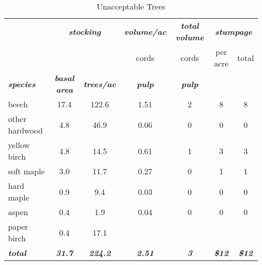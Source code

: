 \documentclass[landscape]{article}
\begin{document}
\begin{table}[H]

\caption{\label{tab:unnamed-chunk-43}Unacceptable Trees}
\fontsize{10}{12}\selectfont
\begin{tabular}[t]{lcccccc}
\toprule
\multicolumn{1}{c}{\em{\textbf{ }}} & \multicolumn{2}{c}{\em{\textbf{stocking}}} & \multicolumn{1}{c}{\em{\textbf{volume/ac }}} & \multicolumn{1}{c}{\em{\textbf{total volume}}} & \multicolumn{2}{c}{\em{\textbf{stumpage}}} \\
\cmidrule(l{3pt}r{3pt}){2-3} \cmidrule(l{3pt}r{3pt}){4-4} \cmidrule(l{3pt}r{3pt}){5-5} \cmidrule(l{3pt}r{3pt}){6-7}
\multicolumn{3}{c}{ } & \multicolumn{1}{c}{cords} & \multicolumn{1}{c}{cords} & \multicolumn{1}{c}{per acre} & \multicolumn{1}{c}{total} \\
\cmidrule(l{3pt}r{3pt}){4-4} \cmidrule(l{3pt}r{3pt}){5-5} \cmidrule(l{3pt}r{3pt}){6-6} \cmidrule(l{3pt}r{3pt}){7-7}
\rowcolor[HTML]{DCDCDC}  \em{\textbf{species}} & \em{\textbf{basal area}} & \em{\textbf{trees/ac}} & \em{\textbf{pulp}} & \em{\textbf{pulp}} & \em{\textbf{ }} & \em{\textbf{ }}\\
\midrule
\rowcolor{gray!6}  beech & 17.4 & 122.6 & 1.51 & 2 & 8 & 8\\
 
other hardwood & 4.8 & 46.9 & 0.06 & 0 & 0 & 0\\
 
\rowcolor{gray!6}  yellow birch & 4.8 & 14.5 & 0.61 & 1 & 3 & 3\\
 
soft maple & 3.0 & 11.7 & 0.27 & 0 & 1 & 1\\
 
\rowcolor{gray!6}  hard maple & 0.9 & 9.4 & 0.03 & 0 & 0 & 0\\
 
aspen & 0.4 & 1.9 & 0.04 & 0 & 0 & 0\\
 
\rowcolor{gray!6}  paper birch & 0.4 & 17.1 &  &  &  & \\
 
\rowcolor[HTML]{DCDCDC}  \em{\textbf{total}} & \em{\textbf{31.7}} & \em{\textbf{224.2}} & \em{\textbf{2.51}} & \em{\textbf{3}} & \em{\textbf{\$12}} & \em{\textbf{\$12}}\\
\bottomrule
\end{tabular}
\end{table}
\end{document}
